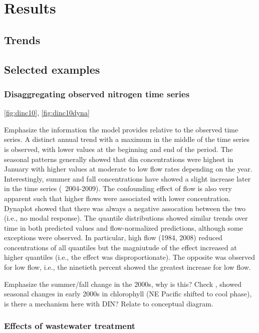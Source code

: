 \documentclass[letterpaper,12pt,oneside]{article}\usepackage[]{graphicx}\usepackage[]{color}
\begin{document}
\section{Results}

\subsection{Trends}

\subsection{Selected examples}

\subsubsection{Disaggregating observed nitrogen time series}

\cref{fig:dinc10}, \cref{fig:dinc10dyna}

Emphasize the information the model provides relative to the observed time series.  A distinct annual trend with a maximum in the middle of the time series is observed, with lower values at the beginning and end of the period.  The seasonal patterns generally showed that \ac{din} concentrations were highest in January with higher values at moderate to low flow rates depending on the year. Interestingly, summer and fall concentrations have showed a slight increase later in the time series (~2004-2009).  The confounding effect of flow is also very apparent such that higher flows were associated with lower concentration.  Dynaplot showed that there was always a negative assocation between the two (i.e., no modal response).  The quantile distributions showed similar trends over time in both predicted values and flow-normalized predictions, although some exceptions were observed.  In particular, high flow (1984, 2008) reduced concentrations of all quantiles but the magniutude of the effect increased at higher quantiles (i.e., the effect was disproportionate).  The opposite was observed for low flow, i.e., the ninetieth percent showed the greatest increase for low flow.     

Emphasize the summer/fall change in the 2000s, why is this?  Check \citep{Cloern07}, showed seasonal changes in early 2000s in chlorophyll (NE Pacific shifted to cool phase), is there a mechanism here with DIN? Relate to conceptual diagram.

\subsubsection{Effects of wastewater treatment}
\end{document}
